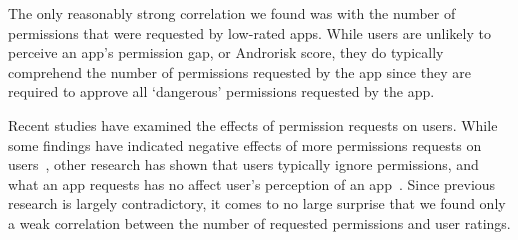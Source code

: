 \documentclass{sig-alternate-05-2015}
\newcommand{\todo}[1]{\textcolor{cyan}{\textbf{[#1]}}}
\begin{document}
The only reasonably strong correlation we found was with the number of permissions that were requested by low-rated apps. While users are unlikely to perceive an app's permission gap, or Androrisk score, they do typically comprehend the number of permissions requested by the app since they are required to approve all `dangerous' permissions requested by the app.

Recent studies have examined the effects of permission requests on users. While some findings have indicated negative effects of more permissions requests on users~\cite{Egelman12choicearchitecture,Lin:2012:EPU:2370216.2370290}, other research has shown that users typically ignore permissions, and what an app requests has no affect user's perception of an app~\cite{Felt:2012:APU:2335356.2335360, Kelley:2012:CPI:2426020.2426027}. Since previous research is largely contradictory, it comes to no large surprise that we found only a weak correlation between the number of requested permissions and user ratings.








%






%
%
\end{document}
